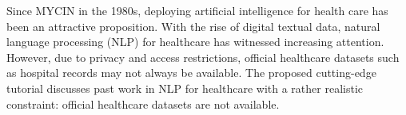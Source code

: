Since MYCIN in the 1980s, deploying artificial intelligence for health care has been an attractive proposition. With the rise of digital textual data, natural language processing (NLP) for healthcare has witnessed increasing attention. However, due to privacy and access restrictions, official healthcare datasets such as hospital records may not always be available. The proposed cutting-edge tutorial discusses past work in NLP for healthcare with a rather realistic constraint: official healthcare datasets are not available.
